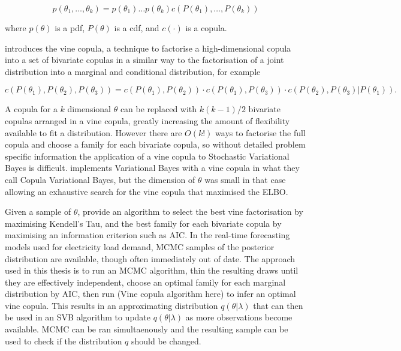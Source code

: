 \documentclass[12pt,a4paper]{article}%
\numberwithin{equation}{section}
\begin{document}
\begin{equation}
\label{vc1}
p(\theta_1, \dots, \theta_k) = p(\theta_1) \dots p(\theta_k) c(P(\theta_1), \dots, P(\theta_k))
\end{equation}

where $p(\theta)$ is a pdf, $P(\theta)$ is a cdf, and $c(\cdot)$ is a copula. 

\citet{Joe1994} introduces the vine copula, a technique to factorise a high-dimensional copula into a set of bivariate copulas in a similar way to the factorisation of a joint distribution into a marginal and conditional distribution, for example

\begin{equation}
\label{vc2}
c(P(\theta_1), P(\theta_2), P(\theta_3)) = c(P(\theta_1), P(\theta_2)) \cdot c(P(\theta_1), P(\theta_3)) \cdot c(P(\theta_2), P(\theta_3) | P(\theta_1)).
\end{equation}

A copula for a $k$ dimensional $\theta$ can be replaced with $k(k-1)/2$ bivariate copulas arranged in a vine copula, greatly increasing the amount of flexibility available to fit a distribution. However there are $O(k!)$ ways to factorise the full copula and choose a family for each bivariate copula, so without detailed problem specific information the application of a vine copula to Stochastic Variational Bayes is difficult. \citet{Tran2015} implements Variational Bayes with a vine copula in what they call Copula Variational Bayes, but the dimension of $\theta$ was small in that case allowing an exhaustive search for the vine copula that maximised the ELBO. 

Given a sample of $\theta$, \citet{Diimann2013} provide an algorithm to select the best vine factorisation by maximising Kendell's Tau, and the best family for each bivariate copula by maximising an information criterion such as AIC. In the real-time forecasting models used for electricity load demand, MCMC samples of the posterior distribution are available, though often immediately out of date. The approach used in this thesis is to run an MCMC algorithm, thin the resulting draws until they are effectively independent, choose an optimal family for each marginal distribution by AIC, then run (Vine copula algorithm here) to infer an optimal vine copula. This results in an approximating distribution $q(\theta | \lambda)$ that can then be used in an SVB algorithm to update $q(\theta | \lambda)$ as more observations become available. MCMC can be ran simultaenously and the resulting sample can be used to check if the distribution $q$ should be changed. 
\end{document}
